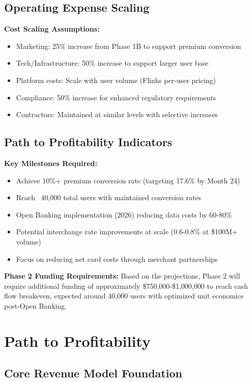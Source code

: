 \documentclass[11pt,letterpaper]{article}
\begin{document}
\subsection{Operating Expense Scaling}

\textbf{Cost Scaling Assumptions:}
\begin{itemize}
\item Marketing: 25\% increase from Phase 1B to support premium conversion
\item Tech/Infrastructure: 50\% increase to support larger user base
\item Platform costs: Scale with user volume (Flinks per-user pricing)
\item Compliance: 50\% increase for enhanced regulatory requirements
\item Contractors: Maintained at similar levels with selective increases
\end{itemize}

\subsection{Path to Profitability Indicators}

\textbf{Key Milestones Required:}
\begin{itemize}
\item Achieve 10\%+ premium conversion rate (targeting 17.6\% by Month 24)
\item Reach ~40,000 total users with maintained conversion rates
\item Open Banking implementation (2026) reducing data costs by 60-80\%
\item Potential interchange rate improvements at scale (0.6-0.8\% at \$100M+ volume)
\item Focus on reducing net card costs through merchant partnerships
\end{itemize}

\textbf{Phase 2 Funding Requirements:}
Based on the projections, Phase 2 will require additional funding of approximately \$750,000-\$1,000,000 to reach cash flow breakeven, expected around 40,000 users with optimized unit economics post-Open Banking.


\newpage

\section{Path to Profitability}

\subsection{Core Revenue Model Foundation}
\end{document}
